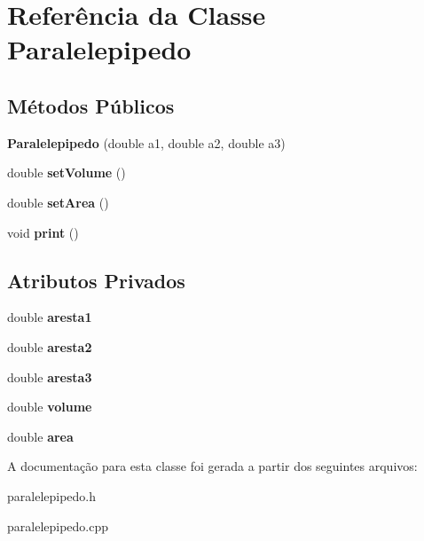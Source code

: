 \hypertarget{classParalelepipedo}{}\section{Referência da Classe Paralelepipedo}
\label{classParalelepipedo}
\subsection*{Métodos Públicos}
\begin{DoxyCompactItemize}
\item 
{\bfseries Paralelepipedo} (double a1, double a2, double a3)\hypertarget{classParalelepipedo_a287c113530e5d08b583150041efbef3f}{}\label{classParalelepipedo_a287c113530e5d08b583150041efbef3f}

\item 
double {\bfseries set\+Volume} ()\hypertarget{classParalelepipedo_a1ccb895a6c346cd790939094d39b53dc}{}\label{classParalelepipedo_a1ccb895a6c346cd790939094d39b53dc}

\item 
double {\bfseries set\+Area} ()\hypertarget{classParalelepipedo_a25e6e64d0328b63a76ebb2bc6e22d202}{}\label{classParalelepipedo_a25e6e64d0328b63a76ebb2bc6e22d202}

\item 
void {\bfseries print} ()\hypertarget{classParalelepipedo_ad4275401c3a31523f4b89064770c3248}{}\label{classParalelepipedo_ad4275401c3a31523f4b89064770c3248}

\end{DoxyCompactItemize}
\subsection*{Atributos Privados}
\begin{DoxyCompactItemize}
\item 
double {\bfseries aresta1}\hypertarget{classParalelepipedo_af10cfb74c3f8982c86e6ffdfbe864b5e}{}\label{classParalelepipedo_af10cfb74c3f8982c86e6ffdfbe864b5e}

\item 
double {\bfseries aresta2}\hypertarget{classParalelepipedo_a9008cc32787edb7ee9d3e0ad82d68f01}{}\label{classParalelepipedo_a9008cc32787edb7ee9d3e0ad82d68f01}

\item 
double {\bfseries aresta3}\hypertarget{classParalelepipedo_ab11e8d15e0c78fe203017c6a9b259ce4}{}\label{classParalelepipedo_ab11e8d15e0c78fe203017c6a9b259ce4}

\item 
double {\bfseries volume}\hypertarget{classParalelepipedo_a1653ceae807f34b8a37a611cd8413c63}{}\label{classParalelepipedo_a1653ceae807f34b8a37a611cd8413c63}

\item 
double {\bfseries area}\hypertarget{classParalelepipedo_aecb7dabb987ddcadb9b24385397cb603}{}\label{classParalelepipedo_aecb7dabb987ddcadb9b24385397cb603}

\end{DoxyCompactItemize}


A documentação para esta classe foi gerada a partir dos seguintes arquivos\+:\begin{DoxyCompactItemize}
\item 
paralelepipedo.\+h\item 
paralelepipedo.\+cpp\end{DoxyCompactItemize}
